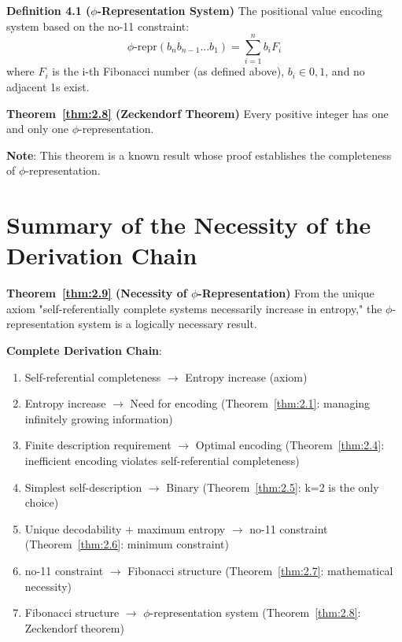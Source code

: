 \textbf{Definition 4.1 ($\phi$-Representation System)}
\label{thm:2.1}
The positional value encoding system based on the no-11 constraint:
\begin{equation}
\text{$\phi$-repr}(b_n b_{n-1}...b_1) = \sum_{i=1}^n b_i F_i
\end{equation}
where $F_i$ is the i-th Fibonacci number (as defined above), $b_i \in {0,1}$, and no adjacent 1s exist.

\textbf{Theorem~\ref{thm:2.8} (Zeckendorf Theorem)}
\label{thm:2.8}
Every positive integer has one and only one $\phi$-representation.

\textbf{Note}: This theorem is a known result whose proof establishes the completeness of $\phi$-representation.

\section{Summary of the Necessity of the Derivation Chain}
\label{sec:ch04_encoding:summary-of-the-necessity-of-the-derivation-chain}

\textbf{Theorem~\ref{thm:2.9} (Necessity of $\phi$-Representation)}
\label{thm:2.9}
From the unique axiom "self-referentially complete systems necessarily increase in entropy," the $\phi$-representation system is a logically necessary result.

\textbf{Complete Derivation Chain}:
\begin{enumerate}
\item Self-referential completeness $\rightarrow$ Entropy increase (axiom)
\item Entropy increase $\rightarrow$ Need for encoding (Theorem~\ref{thm:2.1}: managing infinitely growing information)
\item Finite description requirement $\rightarrow$ Optimal encoding (Theorem~\ref{thm:2.4}: inefficient encoding violates self-referential completeness)
\item Simplest self-description $\rightarrow$ Binary (Theorem~\ref{thm:2.5}: k=2 is the only choice)
\item Unique decodability + maximum entropy $\rightarrow$ no-11 constraint (Theorem~\ref{thm:2.6}: minimum constraint)
\item no-11 constraint $\rightarrow$ Fibonacci structure (Theorem~\ref{thm:2.7}: mathematical necessity)
\item Fibonacci structure $\rightarrow$ $\phi$-representation system (Theorem~\ref{thm:2.8}: Zeckendorf theorem)
\end{enumerate}

